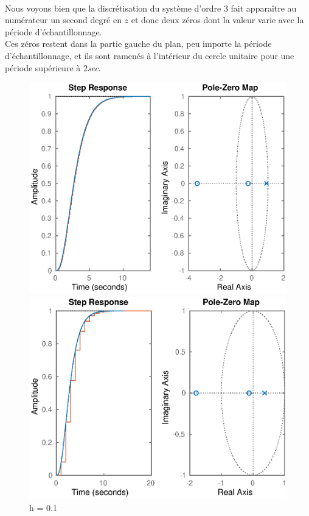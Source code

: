 \paragraph{}
Nous voyons bien que la discrétisation du système d'ordre 3 fait apparaître au numérateur un second degré en $z$ et donc deux zéros dont la valeur varie avec la période d'échantillonnage.
\\Ces zéros restent dans la partie gauche du plan, peu importe la période d'échantillonnage, et ils sont ramenés à l'intérieur du cercle unitaire pour une période supérieure à 2\textit{sec}.
\begin{figure}[!h]  
  \begin{minipage}[b]{0.5\linewidth}
    \includegraphics[width=1\linewidth]{eps/labo1-ordre3-0-1} 
    \caption{h = 0.1} 
    \vspace{4ex}
  \end{minipage}%
  \begin{minipage}[b]{0.5\linewidth}
    \centering
    \includegraphics[width=1\linewidth]{eps/labo1-ordre3-1} 

\end{minipage}
\end{figure}
